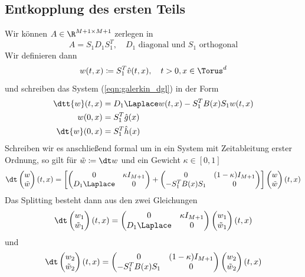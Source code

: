 \subsection{Entkopplung des ersten Teils}
Wir können $A\in\R^{M+1\times M+1}$ zerlegen in
\[A=S_1D_1S_1^T,\quad \text{$D_1$ diagonal und $S_1$ orthogonal}\]
Wir definieren dann 
\[w(t,x)\coloneqq S_1^T\hat{v}(t,x),\quad t>0,x\in\Torus^d\]
und schreiben das System (\ref{eqn:galerkin_dgl}) in der Form
\begin{equation}
\label{eqn:galerkin_dgl_transformed}
\begin{split}
\dtt{w}(t,x)&=D_1\Laplace w(t,x)-S_1^TB(x)S_1w(t,x)\\
w(0,x)&=S_1^T\hat{g}(x)\\
\dt{w}(0,x)&=S_1^T\hat{h}(x)\\
\end{split}
\end{equation}
Schreiben wir es anschließend formal um in ein System mit Zeitableitung erster Ordnung, so gilt für $\tilde{w}\coloneqq \dt w$ und ein Gewicht $\kappa\in[0,1]$
\[\dt\begin{pmatrix}w\\ \tilde{w}\end{pmatrix}(t,x)=\left[\begin{pmatrix}0 & \kappa I_{M+1}\\ D_1\Laplace& 0\end{pmatrix}+\begin{pmatrix}0&(1-\kappa)I_{M+1}\\-S_1^TB(x)S_1 & 0\end{pmatrix}\right]
\begin{pmatrix}w\\\tilde{w}\end{pmatrix}(t,x)\]
Das Splitting besteht dann aus den zwei Gleichungen
\begin{equation}
\label{eqn:galerkin_split1}
\dt\begin{pmatrix}w_1\\ \tilde{w}_1\end{pmatrix}(t,x)=\begin{pmatrix}0 & \kappa I_{M+1}\\ D_1\Laplace& 0\end{pmatrix}\begin{pmatrix}w_1\\\tilde{w}_1\end{pmatrix}(t,x)
\end{equation}
und
\begin{equation}
\label{eqn:galerkin_split2}
\dt\begin{pmatrix}w_2\\ \tilde{w}_2\end{pmatrix}(t,x)=\begin{pmatrix}0&(1-\kappa)I_{M+1}\\-S_1^TB(x)S_1 & 0\end{pmatrix}\begin{pmatrix}w_2\\\tilde{w}_2\end{pmatrix}(t,x)
\end{equation}
